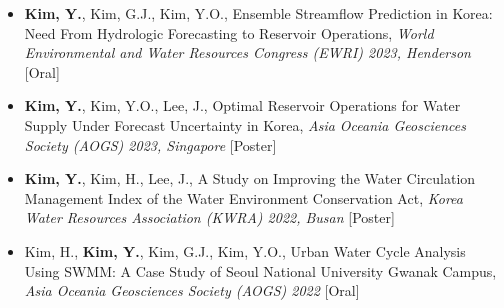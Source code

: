 \begin{itemize}
\item[\textbf{[4]}] \textbf{Kim, Y.}, Kim, G.J., Kim, Y.O., Ensemble Streamflow Prediction in Korea: Need From Hydrologic Forecasting to Reservoir Operations, \textit{World Environmental and Water Resources Congress (EWRI) 2023, Henderson} [Oral]

\item[\textbf{[3]}] \textbf{Kim, Y.}, Kim, Y.O., Lee, J., Optimal Reservoir Operations for Water Supply Under Forecast Uncertainty in Korea, \textit{Asia Oceania Geosciences Society (AOGS) 2023, Singapore} [Poster]

\item[\textbf{[2]}] \textbf{Kim, Y.}, Kim, H., Lee, J., A Study on Improving the Water Circulation Management Index of the Water Environment Conservation Act, \textit{Korea Water Resources Association (KWRA) 2022, Busan} [Poster]

\item[\textbf{[1]}] Kim, H., \textbf{Kim, Y.}, Kim, G.J., Kim, Y.O., Urban Water Cycle Analysis Using SWMM: A Case Study of Seoul National University Gwanak Campus, \textit{Asia Oceania Geosciences Society (AOGS) 2022} [Oral]

\end{itemize}
